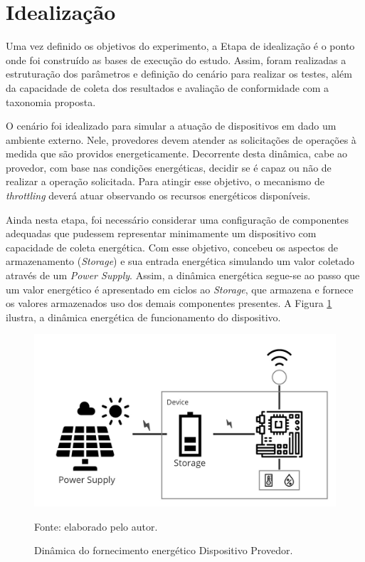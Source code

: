\section{Idealização}
\label{cap6:idealizacao}
Uma vez definido os objetivos do experimento, a Etapa de idealização é o ponto onde foi construído as bases de execução do estudo. Assim, foram realizadas a estruturação  dos parâmetros e definição do cenário para realizar os testes, além da capacidade de coleta dos resultados e avaliação de conformidade com a taxonomia proposta.

O cenário foi idealizado para simular a atuação de dispositivos em dado um ambiente externo. Nele, provedores devem atender as solicitações de operações à medida que são providos energeticamente. Decorrente desta dinâmica, cabe ao provedor, com base nas condições energéticas, decidir se é capaz ou não de realizar a operação solicitada. Para atingir esse objetivo, o mecanismo de \textit{throttling} deverá atuar observando os recursos energéticos disponíveis.

Ainda nesta etapa, foi necessário considerar uma configuração de componentes adequadas que pudessem representar minimamente um dispositivo com capacidade de coleta energética. Com esse objetivo, concebeu os aspectos de armazenamento (\textit{Storage}) e sua entrada energética simulando um valor coletado através de um \textit{Power Supply}. Assim, a dinâmica energética segue-se ao passo que um valor energético é apresentado em ciclos ao \textit{Storage}, que armazena e fornece os valores armazenados uso dos demais componentes presentes. A Figura \ref{fig:cap6dinamica} ilustra, a dinâmica energética de funcionamento do dispositivo.

\begin{figure}[H]
	\centering
	
	\caption{Dinâmica do fornecimento energético Dispositivo Provedor.}
	\label{fig:cap6dinamica}
	\noindent\includegraphics[width=0.75\linewidth]{Imagens/cap6/cap6dinamica.jpg} 
		
	Fonte: elaborado pelo autor.
\end{figure}


